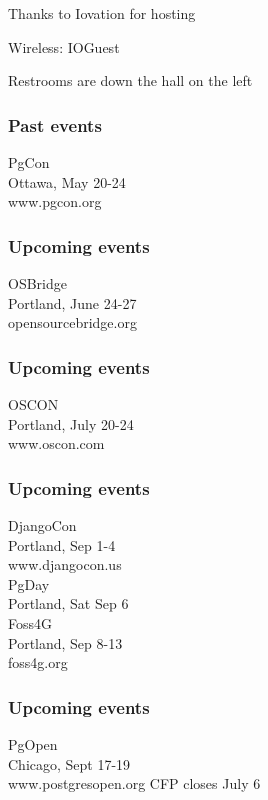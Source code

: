 \documentclass{beamer}
\begin{document}

\frame
{
  \begin{center}
  \item[]Thanks to Iovation for hosting
  \item[]Wireless: IOGuest
  \item[]Restrooms are down the hall on the left
  \end{center}
}

\frame
{
  \frametitle{Past events}
  \begin{center}
{\large PgCon\\}
Ottawa, May 20-24\\
www.pgcon.org
  \end{center}
}
\frame
{
  \frametitle{Upcoming events}
  \begin{center}
{\large OSBridge\\}
Portland, June 24-27\\
opensourcebridge.org
  \end{center}
}

\frame
{
  \frametitle{Upcoming events}
  \begin{center}
{\large OSCON\\}
Portland, July 20-24\\
www.oscon.com
  \end{center}
}

\frame
{
  \frametitle{Upcoming events}
  \begin{center}
{\large DjangoCon\\}
Portland, Sep 1-4\\
www.djangocon.us\\
\vspace{5 mm}
{\large PgDay\\}
Portland, Sat Sep 6\\
\vspace{5 mm}
{\large Foss4G\\}
Portland, Sep 8-13\\
foss4g.org
  \end{center}
}

\frame
{
  \frametitle{Upcoming events}
  \begin{center}
{\large PgOpen\\}
Chicago, Sept 17-19\\
www.postgresopen.org
CFP closes July 6
  \end{center}
}
\end{document}
